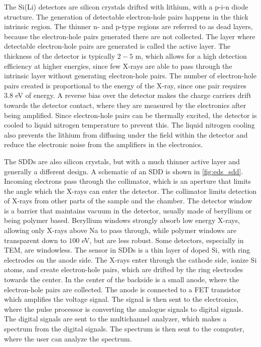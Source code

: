 The Si(Li) detectors are silicon crystals drifted with lithium, with a p-i-n diode structure.
The generation of detectable electron-hole pairs happens in the thick intrinsic region.
The thinner n- and p-type regions are referred to as dead layers, because the electron-hole pairs generated there are not collected.
The layer where detectable electron-hole pairs are generated is called the active layer.
The thickness of the detector is typically $2-5$ \textmu m, which allows for a high detection efficiency at higher energies, since few X-rays are able to pass through the intrinsic layer without generating electron-hole pairs.
The number of electron-hole pairs created is proportional to the energy of the X-ray, since one pair requires $3.8$ eV of energy.
A reverse bias over the detector makes the charge carriers drift towards the detector contact, where they are measured by the electronics after being amplified.
Since electron-hole pairs can be thermally excited, the detector is cooled to liquid nitrogen temperature to prevent this.
The liquid nitrogen cooling also prevents the lithium from diffusing under the field within the detector and reduce the electronic noise from the amplifiers in the electronics.

The SDDs are also silicon crystals, but with a much thinner active layer and generally a different design.
A schematic of an SDD is shown in \cref{fig:eds_sdd}.
Incoming electrons pass through the collimator, which is an aperture that limits the angle which the X-rays can enter the detector.
The collimator limits detection of X-rays from other parts of the sample and the chamber.
The detector window is a barrier that maintains vacuum in the detector, usually made of beryllium or being polymer based.
Beryllium windows strongly absorb low energy X-rays, allowing only X-rays above Na to pass through, while polymer windows are transparent down to $100$ eV, but are less robust.
Some detectors, especially in TEM, are windowless.
The sensor in SDDs is a thin layer of doped Si, with ring electrodes on the anode side.
The X-rays enter through the cathode side, ionize Si atoms, and create electron-hole pairs, which are drifted by the ring electrodes towards the center.
In the center of the backside is a small anode, where the electron-hole pairs are collected.
The anode is connected to a FET transistor which amplifies the voltage signal.
The signal is then sent to the electronics, where the pulse processor is converting the analogue signals to digital signals.
The digital signals are sent to the multichannel analyzer, which makes a spectrum from the digital signals.
The spectrum is then sent to the computer, where the user can analyze the spectrum.


